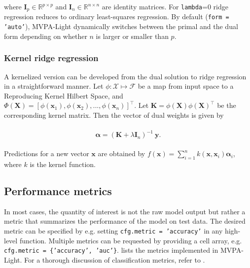 \documentclass[utf8]{frontiersSCNS} %
\newcommand{\al}{\boldsymbol{\alpha}}
\newcommand{\x}{\mathbf{x}}
\newcommand{\y}{\mathbf{y}}
\newcommand{\I}{\mathbf{I}}
\newcommand{\K}{\mathbf{K}}
\newcommand{\R}{\mathbb{R}}
\newcommand{\X}{\mathbf{X}}
\newcommand{\ttt}[1]{\texttt{#1}}
\begin{document}
where $\I_p\in\R^{p\times p}$ and $\I_n\in\R^{n\times n}$ are identity matrices. For \ttt{lambda}=0 ridge regression reduces to ordinary least-squares regression. By default (\ttt{form = 'auto'}), MVPA-Light dynamically switches between the primal and the dual form depending on whether $n$ is larger or smaller than $p$.

\subsubsection{Kernel ridge regression}

A kernelized version can be developed from the dual solution to ridge regression in a straightforward manner. Let $\phi:\mathcal{X}\mapsto\mathcal{F}$ be a map from input space to a Reproducing Kernel Hilbert Space, and $\Phi(\X) = [\phi(\x_1),\phi(\x_2),...,\phi(\x_n)]^\top$. Let $\K = \phi(\X)\phi(\X)^\top$ be the corresponding kernel matrix. Then the vector of dual weights is given by

\begin{align}
\begin{split}
\label{eq:kernel_ridge}
\al = (\K + \lambda\I_n)^{-1}\ \y.
\end{split}
\end{align}

Predictions for a new vector $\x$ are obtained by $f(\x) = \sum_{i=1}^n k(\x, \x_i)\al_i$, where $k$ is the kernel function.


\subsection{Performance metrics}\label{sec:metrics}

In most cases, the quantity of interest is not the raw model output but rather a metric that summarizes the performance of the model on test data. The desired metric can be specified by e.g. setting \ttt{cfg.metric = 'accuracy'} in any high-level function. Multiple metrics can be requested by providing a cell array, e.g. \ttt{cfg.metric = \{'accuracy', 'auc'\}}.  lists the metrics implemented in MVPA-Light. For a thorough discussion of classification metrics, refer to  \cite{Sokolova2009ATasks}.
\end{document}
